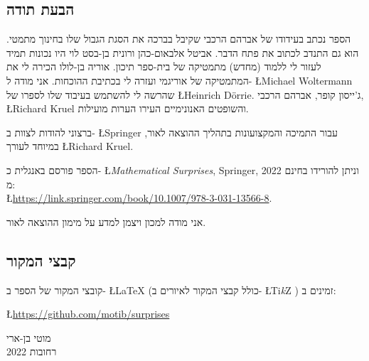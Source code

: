 
\subsection*{הבעת תודה}

הספר נכתב בעידודו של אברהם הרכבי שקיבל בברכה את הסגת הגבול שלו בחינוך מתמטי. הוא גם התנדב לכתוב את פתח הדבר. אביטל אלבאום-כהן ורונית בן-בסט לוי היו נכונות תמיד לעזור לי ללמוד (מחדש) מתמטיקה של בית-ספר תיכון. אוריה בן-לולו הכירה לי את המתמטיקה של אוריגמי ועזרה לי בכתיבת ההוכחות. אני מודה ל-%
\L{Michael Woltermann}
שהרשה לי להשתמש בעיבוד שלו לספרו של
\L{Heinrich D\"{o}rrie}.
ג'ייסון קופר, אברהם הרכבי,
\L{Richard Kruel}
והשופטים האנונימיים העירו הערות מועילות.

ברצוני להודות לצוות ב-%
\L{Springer}
עבור התמיכה והמקצועונות בתהליך ההוצאה לאור, במיוחד לעורך
\L{Richard Kruel}.

הספר פורסם באנגלית כ-%
\L{\textit{Mathematical Surprises}, Springer, 2022}
וניתן להורידו בחינם מ:\\
\L{\url{https://link.springer.com/book/10.1007/978-3-031-13566-8}}.

אני מודה למכון ויצמן למדע על מימון ההוצאה לאור.

\subsection*{קבצי המקור}
קובצי המקור של הספר ב-%
\L{\LaTeX{}}
(כולל קבצי המקור לאיורים ב-%
\L{Ti\textit{k}Z}%
)
זמינים ב:
\begin{center}
\L{\url{https://github.com/motib/surprises}}
\end{center}

\medskip

\begin{flushleft}
מוטי בן-ארי
\\
רחובות
2022
\end{flushleft}

\tableofcontents

